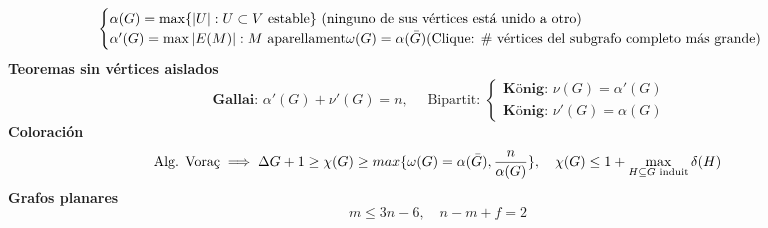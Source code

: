 \documentclass{article}
\newcommand{\h}{\hspace{1em}}
\renewcommand{\t}[1]{\text{#1}}
\begin{document}
$$
\begin{cases}
\alpha(G) = \max\{|U|: U\subset V \text{ estable}\} \text{ (ninguno de sus vértices está unido a otro)} \\
\alpha'(G) = \max{|E(M)|: M \text{ aparellament}}
\omega(G) = \alpha(\Bar{G}) (\text{Clique: \# vértices del subgrafo completo más grande})
\end{cases}
$$
\textbf{Teoremas sin vértices aislados}
$$
\textbf{ Gallai: } \alpha'(G) + \nu'(G)=n, \h \t{ Bipartit: } \begin{cases}
\textbf{König: } \nu(G)=\alpha'(G) \\
\textbf{König: } \nu'(G)=\alpha(G)
\end{cases} 
$$
\textbf{Coloración}\\
$$
\text{Alg. Voraç} \implies \Delta G + 1 \geq \chi(G)\geq max\{\omega(G)=\alpha(\Bar{G}), \frac{n}{\alpha(G)}\}, \h \chi (G)\leq 1 + \max_{H\subseteq G \text{ induit}} \delta(H)
$$
\textbf{Grafos planares}
$$
m\leq 3n -6, \h n-m+f = 2
$$
\end{document}
